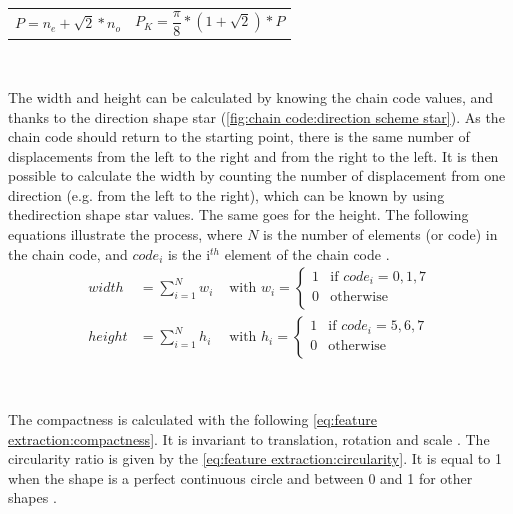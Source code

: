 \noindent\begin{tabularx}{\textwidth}{@{}XX@{}}
	\begin{equation} \label{eq:feature extraction:perimeter}
		P = n_e + \sqrt{2}*n_o 
	\end{equation} & 
	\begin{equation} \label{eq:feature extraction:kulpa}
		P_K = \frac{\pi}{8} * (1 + \sqrt{2}) * P 
	\end{equation}
\end{tabularx}




~~

The width and height can be calculated by knowing the chain code values, and thanks to the direction shape star (\vref{fig:chain code:direction scheme star}). As the chain code should return to the starting point, there is the same number of displacements from the left to the right and from the right to the left. It is then possible to calculate the width by counting the number of displacement from one direction (e.g. from the left to the right), which can be known by using thedirection shape star values. The same goes for the height. The following equations illustrate the process, where $N$ is the number of elements (or code) in the chain code, and $code_i$ is the i$^{th}$ element of the chain code \cite{bib:chain:ShapeDescription}.
\begin{align}
width &= \sum_{i = 1}^{N} w_i 
& \text{ with } w_i = 
	\begin{cases}
		1 & \text{if } code_i = 0, 1, 7 \\
		0 & \text{otherwise} \\
	\end{cases} \\
height &= \sum_{i = 1}^{N} h_i 
& \text{ with }  h_i = 
	\begin{cases}
		1 & \text{if } code_i = 5, 6, 7 \\
		0 & \text{otherwise} \\
	\end{cases} 
\end{align}


~~

The compactness is calculated with the following \vref{eq:feature extraction:compactness}. It is invariant to translation, rotation and scale  \cite{bib:chain:RepresentationAndDescription}. The circularity ratio is given by the \vref{eq:feature extraction:circularity}. It is equal to 1 when the shape is a perfect continuous circle and between 0 and 1 for other shapes \cite{bib:chain:ObjectDescription}.



